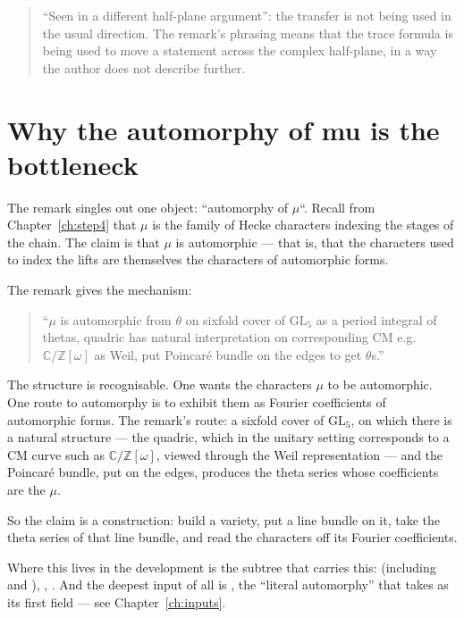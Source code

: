 \begin{quote}
``Seen in a different half-plane argument'': the transfer is not being used
in the usual direction. The remark's phrasing means that the trace formula is
being used to move a statement across the complex half-plane, in a way the
author does not describe further.
\end{quote}

\section{Why the automorphy of mu is the bottleneck}The remark singles out one object: ``automorphy of $\mu$``. Recall from
Chapter~\ref{ch:step4} that $\mu$ is the family of Hecke characters indexing
the stages of the chain. The claim is that $\mu$ is automorphic --- that is,
that the characters used to index the lifts are themselves the characters of
automorphic forms.

The remark gives the mechanism:

\begin{quote}
\small
``$\mu$ is automorphic from $\theta$ on sixfold cover of $\mathrm{GL}_5$ as a
period integral of thetas, quadric has natural interpretation on corresponding
CM e.g.\ $\mathbb{C}/\mathbb{Z}[\omega]$ as Weil, put Poincar\'e bundle on the
edges to get $\theta$s.''
\end{quote}

The structure is recognisable. One wants the characters $\mu$ to be
automorphic. One route to automorphy is to exhibit them as Fourier
coefficients of automorphic forms. The remark's route: a sixfold cover of
$\mathrm{GL}_5$, on which there is a natural structure --- the quadric, which
in the unitary setting corresponds to a CM curve such as
$\mathbb{C}/\mathbb{Z}[\omega]$, viewed through the Weil representation ---
and the Poincar\'e bundle, put on the edges, produces the theta series whose
coefficients are the $\mu$.

So the claim is a construction: build a variety, put a line bundle on it,
take the theta series of that line bundle, and read the characters off its
Fourier coefficients.

\begin{seamnote}{Where this lives in the development}
is the subtree that carries this:  (including
 and ),
, . And the deepest input of all is
, the ``literal automorphy''
that  takes as its first field --- see
Chapter~\ref{ch:inputs}.
\end{seamnote}

